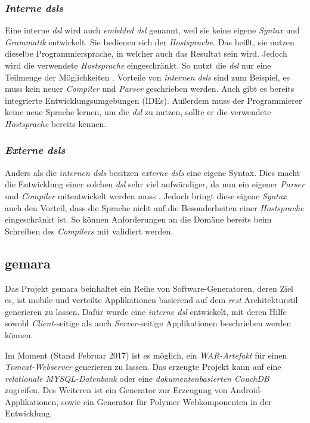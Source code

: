 \subsubsection{\textit{Interne \acsp{dsl}}} \label{sec:intern}
Eine interne \textit{\acs{dsl}} wird auch \textit{embdded \acs{dsl}} genannt, weil sie keine eigene \textit{Syntax} und \textit{Grammatik} entwickelt. Sie bedienen sich der \textit{Hostsprache}. Das heißt, sie nutzen dieselbe Programmiersprache, in welcher auch das Resultat sein wird.
Jedoch wird die verwendete \textit{Hostsprache} eingeschränkt. So nutzt die \textit{\acl{dsl}} nur eine Teilmenge der Möglichkeiten \cite{dsl}. Vorteile von \textit{internen \acsp{dsl}} sind zum Beispiel, es muss kein neuer \textit{Compiler} und \textit{Parser} geschrieben werden. Auch gibt es bereits integrierte Entwicklungsumgebungen (IDEs). Außerdem muss der Programmierer keine neue Sprache lernen, um die \textit{\acl{dsl}} zu nutzen, sollte er die verwendete \textit{Hostsprache} bereits kennen. 

\subsubsection{\textit{Externe \acsp{dsl}}} \label{sec:extern}

Anders als die \textit{internen \acsp{dsl}} besitzen \textit{externe \acsp{dsl}} eine eigene Syntax. Dies macht die Entwicklung einer solchen \textit{\acl{dsl}} sehr viel aufwändiger, da nun ein eigener \textit{Parser} und \textit{Compiler} mitentwickelt werden muss \cite{dsl}. Jedoch bringt diese eigene \textit{Syntax} auch den Vorteil, dass die Sprache nicht auf die Besonderheiten einer \textit{Hostsprache} eingeschränkt ist. So können Anforderungen an die Domäne bereits beim Schreiben des \textit{Compilers} mit validiert werden.

\subsection{\acf{gemara}}\label{sec:gemara}

Das Projekt \acs{gemara} beinhaltet ein Reihe von Software-Generatoren, deren Ziel es, ist mobile und verteilte Applikationen basierend auf dem \textit{\acs{rest}} Architekturstil generieren zu lassen. Dafür wurde eine \textit{interne \acs{dsl}} entwickelt, mit deren Hilfe sowohl \textit{Client}-seitige als auch \textit{Server}-seitige Applikationen beschrieben werden können.

Im Moment (Stand Februar 2017) ist es möglich, ein \textit{WAR-Artefakt} für einen \textit{Tomcat-Webserver} generieren zu lassen. Das erzeugte Projekt kann auf eine \textit{relationale MYSQL-Datenbank} oder eine \textit{dokumentenbasierten CouchDB} zugreifen. Des Weiteren ist ein Generator zur Erzeugung von Android-Applikationen, sowie ein Generator für Polymer Webkomponenten in der Entwicklung.

